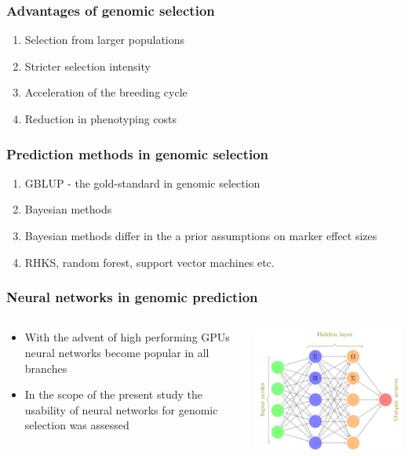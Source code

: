 \documentclass{beamer}
\begin{document}
\begin{frame}
  \frametitle{Advantages of genomic selection}
  \begin{enumerate}[<+->]
  \item Selection from larger populations
  \item Stricter selection intensity 
  \item Acceleration of the breeding cycle
  \item Reduction in phenotyping costs
  \end{enumerate}
\end{frame}


\begin{frame}
  \frametitle{Prediction methods in genomic selection}
  \begin{enumerate}[<+->]
  \item GBLUP - the gold-standard in genomic selection
  \item Bayesian methods
  \item Bayesian methods differ in the a prior assumptions on marker effect sizes
  \item RHKS, random forest, support vector machines etc.
  \end{enumerate}    
\end{frame}
 

\begin{frame}
   \frametitle{Neural networks in genomic prediction}
   \begin{columns}
     \begin{column}{0.5\textwidth}
       \begin{itemize}
       \item With the advent of high performing GPUs neural networks become popular in all branches
         \item In the scope of the present study the usability of neural networks for genomic selection was assessed 
       \end{itemize}
     \end{column}
     \begin{column}{0.5\textwidth}
        \includegraphics[height=.6\textheight,width=.9\textwidth]{neuralnet}
     \end{column}
   \end{columns}
\end{frame}
 
\end{document}

